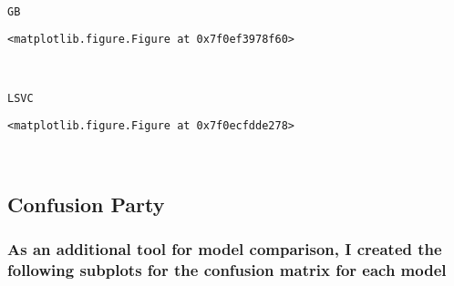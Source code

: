 \documentclass[11pt]{article}
\begin{document}
    
    \begin{center}
    \end{center}
    { \hspace*{\fill} \\}
    
    \begin{Verbatim}[commandchars=\\\{\}]
GB

    \end{Verbatim}

    
    \begin{verbatim}
<matplotlib.figure.Figure at 0x7f0ef3978f60>
    \end{verbatim}

    
    \begin{center}
    \end{center}
    { \hspace*{\fill} \\}
    
    \begin{Verbatim}[commandchars=\\\{\}]
LSVC

    \end{Verbatim}

    
    \begin{verbatim}
<matplotlib.figure.Figure at 0x7f0ecfdde278>
    \end{verbatim}

    
    \begin{center}
    \end{center}
    { \hspace*{\fill} \\}
    
    \subsection{Confusion Party}\label{confusion-party}

    \subsubsection{As an additional tool for model comparison, I created the
following subplots for the confusion matrix for each
model}\label{as-an-additional-tool-for-model-comparison-i-created-the-following-subplots-for-the-confusion-matrix-for-each-model}
\end{document}
